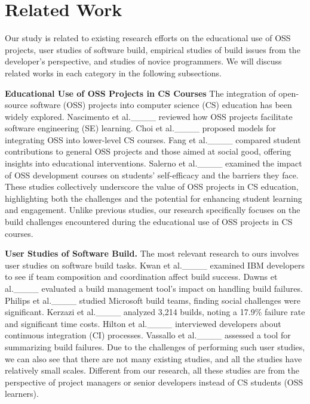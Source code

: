 \section{Related Work}
\label{sec:related}

Our study is related to existing research efforts on the educational use of OSS projects, user studies of software build, empirical studies of build issues from the developer's perspective, and studies of novice programmers. We will discuss related works in each category in the following subsections.

\textbf{Educational Use of OSS Projects in CS Courses}
The integration of open-source software (OSS) projects into computer science (CS) education has been widely explored. 
Nascimento et al.____ reviewed how OSS projects facilitate software engineering (SE) learning. 
Choi et al.____ proposed models for integrating OSS into lower-level CS courses. 
Fang et al.____ compared student contributions to general OSS projects and those aimed at social good, offering insights into educational interventions. 
Salerno et al.____ examined the impact of OSS development courses on students' self-efficacy and the barriers they face. 
These studies collectively underscore the value of OSS projects in CS education, highlighting both the challenges and the potential for enhancing student learning and engagement. Unlike previous studies, our research specifically focuses on the build challenges encountered during the educational use of OSS projects in CS courses.

\textbf{User Studies of Software Build.} The most relevant research to ours involves user studies on software build tasks. 
Kwan et al.____ examined IBM developers to see if team composition and coordination affect build success. 
Dawns et al.____ evaluated a build management tool's impact on handling build failures.
Philips et al.____ studied Microsoft build teams, finding social challenges were significant.
Kerzazi et al.____ analyzed 3,214 builds, noting a 17.9\% failure rate and significant time costs.
Hilton et al.____ interviewed developers about continuous integration (CI) processes.
Vassallo et al.____ assessed a tool for summarizing build failures. 
Due to the challenges of performing such user studies, we can also see that there are not many existing studies, and all the studies have relatively small scales. 
Different from our research, all these studies are from the perspective of project managers or senior developers instead of CS students (OSS learners). 

